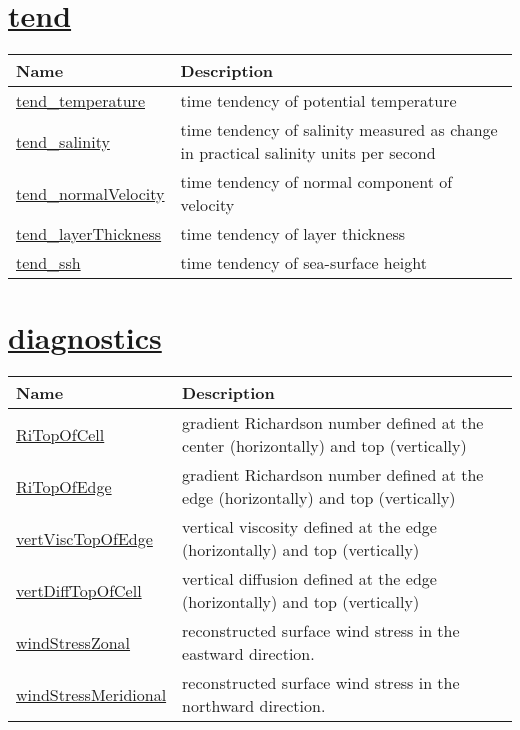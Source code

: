 \section[tend]{\hyperref[sec:var_sec_tend]{tend}}
\label{sec:var_tab_tend}
{\small
\begin{center}
\begin{longtable}{| p{2.0in} | p{4.0in} |}
	\hline
	{\bf Name} & {\bf Description} \\
	\hline
	\hyperref[subsec:var_sec_tend_tend_temperature]{tend\_temperature} & time tendency of potential temperature \\
	\hline
	\hyperref[subsec:var_sec_tend_tend_salinity]{tend\_salinity} & time tendency of salinity measured as change in practical salinity units per second \\
	\hline
	\hyperref[subsec:var_sec_tend_tend_normalVelocity]{tend\_normalVelocity} & time tendency of normal component of velocity \\
	\hline
	\hyperref[subsec:var_sec_tend_tend_layerThickness]{tend\_layerThickness} & time tendency of layer thickness \\
	\hline
	\hyperref[subsec:var_sec_tend_tend_ssh]{tend\_ssh} & time tendency of sea-surface height \\
	\hline
\end{longtable}
\end{center}
}
\section[diagnostics]{\hyperref[sec:var_sec_diagnostics]{diagnostics}}
\label{sec:var_tab_diagnostics}
{\small
\begin{center}
\begin{longtable}{| p{2.0in} | p{4.0in} |}
	\hline
	{\bf Name} & {\bf Description} \\
	\hline
	\hyperref[subsec:var_sec_diagnostics_RiTopOfCell]{RiTopOfCell} & gradient Richardson number defined at the center (horizontally) and top (vertically) \\
	\hline
	\hyperref[subsec:var_sec_diagnostics_RiTopOfEdge]{RiTopOfEdge} & gradient Richardson number defined at the edge (horizontally) and top (vertically) \\
	\hline
	\hyperref[subsec:var_sec_diagnostics_vertViscTopOfEdge]{vertViscTopOfEdge} & vertical viscosity defined at the edge (horizontally) and top (vertically) \\
	\hline
	\hyperref[subsec:var_sec_diagnostics_vertDiffTopOfCell]{vertDiffTopOfCell} & vertical diffusion defined at the edge (horizontally) and top (vertically) \\
	\hline
	\hyperref[subsec:var_sec_diagnostics_windStressZonal]{windStressZonal} & reconstructed surface wind stress in the eastward direction. \\
	\hline
	\hyperref[subsec:var_sec_diagnostics_windStressMeridional]{windStressMeridional} & reconstructed surface wind stress in the northward direction. \\
	\hline
\end{longtable}
\end{center}
}
